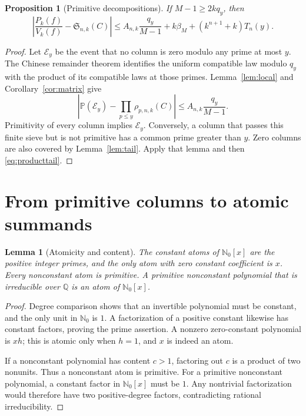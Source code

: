 \documentclass[11pt]{amsart}
\newcommand{\Nzero}{\mathbb N_0}
\newcommand{\Q}{\mathbb Q}
\newcommand{\Prob}{\mathbb P}
\newcommand{\Sseries}{\mathfrak S}
\newtheorem{proposition}[theorem]{Proposition}
\newtheorem{lemma}[theorem]{Lemma}
\theoremstyle{definition}
\theoremstyle{remark}
\begin{document}
\begin{proposition}[Primitive decompositions]\label{prop:primitive}
If $M-1\ge2kq_y$, then
\begin{equation}\label{eq:primitiveerror}
\left|\frac{P_k(f)}{V_k(f)}-\Sseries_{n,k}(C)\right|
\le
A_{n,k}\frac{q_y}{M-1}
+k\beta_M+(k^{n+1}+k)T_n(y).
\end{equation}
\end{proposition}

\begin{proof}
Let $\mathcal E_y$ be the event that no column is zero modulo any
prime at most $y$. The Chinese remainder theorem identifies the
uniform compatible law modulo $q_y$ with the product of its
compatible laws at those primes. Lemma~\ref{lem:local} and
Corollary~\ref{cor:matrix} give
\[
\left|\Prob(\mathcal E_y)-\prod_{p\le y}\rho_{p,n,k}(C)\right|
\le A_{n,k}\frac{q_y}{M-1}.
\]
Primitivity of every column implies $\mathcal E_y$. Conversely, a
column that passes this finite sieve but is not primitive has a common
prime greater than $y$. Zero columns are also covered by
Lemma~\ref{lem:tail}. Apply that lemma and then
\eqref{eq:producttail}.
\end{proof}

\section{From primitive columns to atomic summands}\label{sec:atoms}

\begin{lemma}[Atomicity and content]\label{lem:atomfacts}
The constant atoms of $\Nzero[x]$ are the positive integer primes, and
the only atom with zero constant coefficient is $x$. Every
nonconstant atom is primitive. A primitive nonconstant polynomial
that is irreducible over $\Q$ is an atom of $\Nzero[x]$.
\end{lemma}

\begin{proof}
Degree comparison shows that an invertible polynomial must be constant,
and the only unit in $\Nzero$ is $1$. A factorization of a positive
constant likewise has constant factors, proving the prime assertion.
A nonzero zero-constant polynomial is $xh$; this is atomic only when
$h=1$, and $x$ is indeed an atom.

If a nonconstant polynomial has content $c>1$, factoring out $c$
is a product of two nonunits. Thus a nonconstant atom is primitive.
For a primitive nonconstant polynomial, a constant factor in
$\Nzero[x]$ must be $1$. Any nontrivial factorization would therefore
have two positive-degree factors, contradicting rational
irreducibility.
\end{proof}
\end{document}
